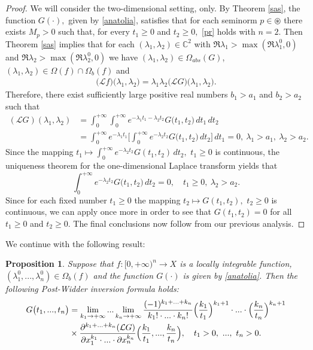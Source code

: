 \documentclass{amsart}
\newtheorem{prop}[thm]{Proposition}
\theoremstyle{definition}
\theoremstyle{remark}
\numberwithin{equation}{section}
\begin{document}
\begin{proof}
We will consider the two-dimensional setting, only.
By Theorem \ref{sas}, the function $G(\cdot),$ given by \eqref{anatolia}, satisfies that for each seminorm $p\in \circledast$ there exists $M_{p}>0$ such that, for every $t_{1}\geq 0 $ and $t_{2}\geq 0,$  \eqref{pr} holds with $n=2.$ Then Theorem \ref{sas} implies that for each $(\lambda_{1}, \lambda_{2})\in {\mathbb C}^{2}$ with $\Re \lambda_{1}>\max(\Re \lambda_{1}^{0},0)$ and $\Re \lambda_{2}>\max(\Re \lambda_{2}^{0},0)$ we have $(\lambda_{1},\lambda_{2})\in \Omega_{abs}(G)$, $(\lambda_{1},\lambda_{2})\in \Omega (f) \cap \Omega_{b}(f)$ and
\begin{align*}
\bigl( {\mathcal L} f\bigr) \bigl(\lambda_{1},\lambda_{2} \bigr)=\lambda_{1} \lambda_{2} \bigl( {\mathcal L} G\bigr) \bigl(\lambda_{1},\lambda_{2} \bigr).
\end{align*}
Therefore, there exist sufficiently large positive real numbers $b_{1}>a_{1}$ and $b_{2}>a_{2}$ such that 
\begin{align*} 
( {\mathcal L} G) (\lambda_{1},\lambda_{2} )&=\int^{+\infty}_{0}\int^{+\infty}_{0}e^{-\lambda_{1}t_{1}-\lambda_{2}t_{2}}G\bigl(t_{1},t_{2} \bigr)\, dt_{1}\, dt_{2}
\\& =\int^{+\infty}_{0}e^{-\lambda_{1}t_{1}}\Biggl[\int^{+\infty}_{0}e^{-\lambda_{2}t_{2}}G\bigl(t_{1},t_{2} \bigr)\, dt_{2}\Biggr]\, dt_{1} =0,\ \lambda_{1}>a_{1},\ \lambda_{2}>a_{2}.
\end{align*} 
Since the mapping $t_{1}\mapsto \int^{+\infty}_{0}e^{-\lambda_{2}t_{2}}G(t_{1},t_{2} )\, dt_{2},$ $t_{1}\geq 0$ is continuous, the uniqueness theorem for the one-dimensional Laplace transform \cite[Theorem 1.4.5]{FKP} yields that 
$$
\int^{+\infty}_{0}e^{-\lambda_{2}t_{2}}G\bigl(t_{1},t_{2} \bigr)\, dt_{2}=0,\quad t_{1}\geq 0,\ \lambda_{2}>a_{2}.
$$
Since for each fixed number $t_{1}\geq 0$ the mapping $t_{2}\mapsto G(t_{1},t_{2} ),$ $t_{2}\geq 0$ is continuous, we can apply \cite[Theorem 1.4.5]{FKP} once more in order to see that $G(t_{1},t_{2} )=0$ for all $t_{1}\geq 0$ and $t_{2}\geq 0$. The final conclusions now follow from our previous analysis.
\end{proof}

We continue with the following result:

\begin{prop}\label{intr}
Suppose that  
$f: [0,+\infty)^{n}\rightarrow X$ is a locally integrable function, $(\lambda_{1}^{0},...,\lambda_{n}^{0})\in \Omega_{b}(f)$ and the function $G(\cdot)$ is given by \eqref{anatolia}. Then the following Post-Widder inversion formula holds:
\begin{align}\notag
G\bigl(t_{1},...,t_{n}\bigr)&=\lim_{k_{1}\rightarrow +\infty}...\lim_{k_{n}\rightarrow +\infty}\frac{(-1)^{k_{1}+...+k_{n}}}{k_{1}! \cdot ... \cdot k_{n}!}\Bigl( \frac{k_{1}}{t_{1}}\Bigr)^{k_{1}+1}\cdot ... \cdot \Bigl( \frac{k_{n}}{t_{n}}\Bigr)^{k_{n}+1}\\\label{pwg}& \times \frac{\partial^{k_{1}+...+k_{n}}({\mathcal L G})}{\partial x_{1}^{k_{1}}\cdot ... \cdot \partial x_{n}^{k_{n}}}\Bigl( \frac{k_{1}}{t_{1}},...,\frac{k_{n}}{t_{n}}\Bigr),\quad t_{1}>0,\ ...,\ t_{n}>0.
\end{align}
\end{prop}
\end{document}
